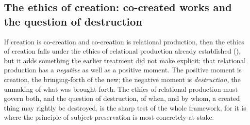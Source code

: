 \subsection{The ethics of creation: co-created works and the question of destruction}
\label{p21:sub:cr-ethics}

If creation is co-creation and co-creation is relational production, then the ethics of creation falls under the ethics of relational production already established (), but it adds something the earlier treatment did not make explicit: that relational production has a \emph{negative} as well as a positive moment. The positive moment is creation, the bringing-forth of the new; the negative moment is \emph{destruction}, the unmaking of what was brought forth. The ethics of relational production must govern both, and the question of destruction, of when, and by whom, a created thing may rightly be destroyed, is the sharp test of the whole framework, for it is where the principle of subject-preservation is most concretely at stake.

